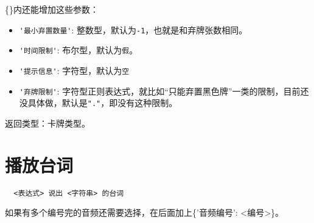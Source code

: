 \{\}内还能增加这些参数：

\begin{itemize}
  \item \verb|'最小弃置数量'|: 整数型，默认为\verb|-1|，也就是和弃牌张数相同。
  \item \verb|'时间限制'|: 布尔型，默认为\verb|假|。
  \item \verb|'提示信息'|: 字符型，默认为\verb|空|
  \item \verb|'弃牌限制'|: 字符型正则表达式，就比如“只能弃置黑色牌”一类的限制，目前还没具体做，默认是\verb|"."|，即没有这种限制。
\end{itemize}

返回类型：卡牌类型。

\section{播放台词}

\begin{verbatim}
  <表达式> 说出 <字符串> 的台词
\end{verbatim}

如果有多个编号完的音频还需要选择，在后面加上\{'音频编号': <编号>\}。